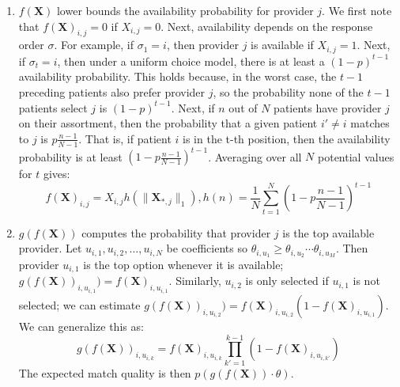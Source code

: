 \begin{enumerate}
    \item $f(\mathbf{X})$ lower bounds the availability probability for provider $j$. We first note that $f(\mathbf{X})_{i,j}=0$ if $X_{i,j} = 0$. Next, availability depends on the response order $\sigma$. For example, if $\sigma_{1}=i$, then provider $j$ is available if $X_{i,j}=1$. Next, if $\sigma_{t}=i$, then under a uniform choice model, there is at least a $(1-p)^{t-1}$ availability probability. This holds because, in the worst case, the $t-1$ preceding patients also prefer provider $j$, so the probability none of the $t-1$ patients select $j$ is $(1-p)^{t-1}$. 
    Next, if $n$ out of $N$ patients have provider $j$ on their assortment, then the probability that a given patient $i' \neq i$ matches to $j$ is $p \frac{n-1}{N-1}$. 
    That is, if patient $i$ is in the t-th position, then the availability probability is at least $(1-p \frac{n-1}{N-1})^{t-1}$. Averaging over all $N$ potential values for $t$ gives: 
    \begin{equation}
       f(\mathbf{X})_{i,j} = X_{i,j} h(\lVert \mathbf{X}_{*,j} \rVert_{1})  , h(n) = \frac{1}{N} \sum_{t=1}^{N} (1-p \frac{n-1}{N-1})^{t-1}
    \end{equation}
    
    \item $g(f(\mathbf{X}))$ computes the probability that provider $j$ is the top available provider.  
    Let $u_{i,1}, u_{i,2},\ldots,u_{i,N}$ be coefficients so $\theta_{i,u_{1}} \geq \theta_{i,u_{2}} \cdots \theta_{i,u_{M}}$. 
    Then provider $u_{i,1}$ is the top option whenever it is available; $g(f(\mathbf{X}))_{i,u_{i,1}}) = f(\mathbf{X})_{i,u_{i,1}}$. 
    Similarly, $u_{i,2}$ is only selected if $u_{i,1}$ is not selected; we can estimate $g(f(\mathbf{X}))_{i,u_{i,2}}) = f(\mathbf{X})_{i,u_{i,2}} (1-f(\mathbf{X})_{i,u_{i,1}})$. 
    We can generalize this as: 
    \begin{equation}
        g(f(\mathbf{X}))_{i,u_{i,k}} = f(\mathbf{X})_{i,u_{i,k}} \prod_{k'=1}^{k-1} (1-f(\mathbf{X})_{i,u_{i,k'}})
    \end{equation}
    The expected match quality is then $p(g(f(\mathbf{X})) \cdot \theta)$.  
\end{enumerate} 


